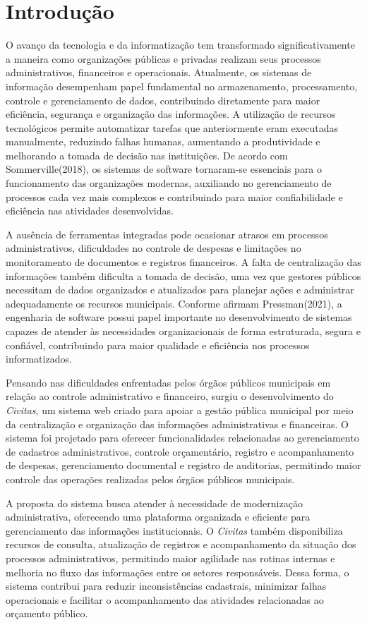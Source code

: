 \chapter{Introdução}

O avanço da tecnologia e da informatização tem transformado significativamente a maneira como organizações públicas e privadas realizam seus processos administrativos, financeiros e operacionais. Atualmente, os sistemas de informação desempenham papel fundamental no armazenamento, processamento, controle e gerenciamento de dados, contribuindo diretamente para maior eficiência, segurança e organização das informações. A utilização de recursos tecnológicos permite automatizar tarefas que anteriormente eram executadas manualmente, reduzindo falhas humanas, aumentando a produtividade e melhorando a tomada de decisão nas instituições. De acordo com Sommerville(2018), os sistemas de software tornaram-se essenciais para o funcionamento das organizações modernas, auxiliando no gerenciamento de processos cada vez mais complexos e contribuindo para maior confiabilidade e eficiência nas atividades desenvolvidas.

A ausência de ferramentas integradas pode ocasionar atrasos em processos administrativos, dificuldades no controle de despesas e limitações no monitoramento de documentos e registros financeiros. A falta de centralização das informações também dificulta a tomada de decisão, uma vez que gestores públicos necessitam de dados organizados e atualizados para planejar ações e administrar adequadamente os recursos municipais. Conforme afirmam Pressman(2021), a engenharia de software possui papel importante no desenvolvimento de sistemas capazes de atender às necessidades organizacionais de forma estruturada, segura e confiável, contribuindo para maior qualidade e eficiência nos processos informatizados.

Pensando nas dificuldades enfrentadas pelos órgãos públicos municipais em relação ao controle administrativo e financeiro, surgiu o desenvolvimento do \textit{Civitas}, um sistema web criado para apoiar a gestão pública municipal por meio da centralização e organização das informações administrativas e financeiras. O sistema foi projetado para oferecer funcionalidades relacionadas ao gerenciamento de cadastros administrativos, controle orçamentário, registro e acompanhamento de despesas, gerenciamento documental e registro de auditorias, permitindo maior controle das operações realizadas pelos órgãos públicos municipais.

A proposta do sistema busca atender à necessidade de modernização administrativa, oferecendo uma plataforma organizada e eficiente para gerenciamento das informações institucionais. O \textit{Civitas} também disponibiliza recursos de consulta, atualização de registros e acompanhamento da situação dos processos administrativos, permitindo maior agilidade nas rotinas internas e melhoria no fluxo das informações entre os setores responsáveis. Dessa forma, o sistema contribui para reduzir inconsistências cadastrais, minimizar falhas operacionais e facilitar o acompanhamento das atividades relacionadas ao orçamento público.

